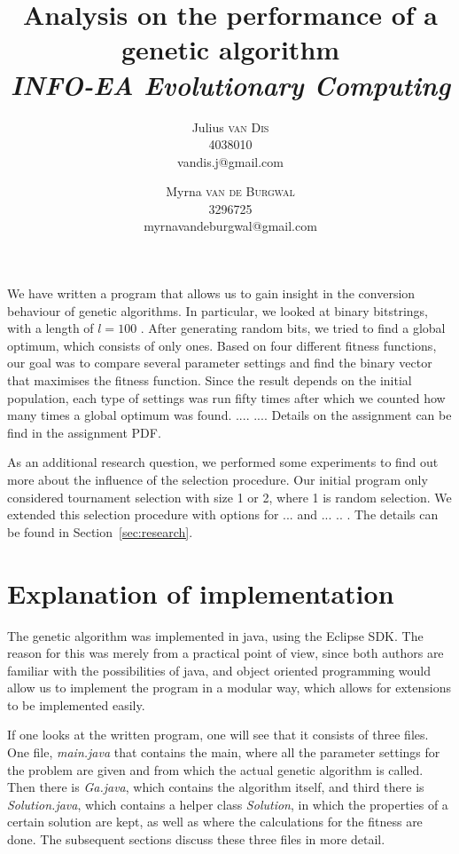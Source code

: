 \documentclass[10pt,a4paper,onecolumn]{article}
\title{Analysis on the performance of a genetic algorithm\\ \textit{INFO-EA Evolutionary Computing}}
\author{Julius \textsc{van Dis} \\ 4038010 \\vandis.j@gmail.com
\and Myrna \textsc{van de Burgwal} \\ 3296725 \\myrnavandeburgwal@gmail.com}
\begin{document}
\maketitle
\thispagestyle{empty}
%
\section*{}
We have written a program that allows us to gain insight in the conversion behaviour of genetic algorithms. In particular, we looked at binary bitstrings, with a length of $l=100$ . After generating random bits, we tried to find a global optimum, which consists of only ones. Based on four different fitness functions, our goal was to compare several parameter settings and find the binary vector that maximises the fitness function. Since the result depends on the initial population, each type of settings was run fifty times after which we counted how many times a global optimum was found.
....
....
Details on the assignment can be find in the assignment PDF.

As an additional research question, we performed some experiments to find out more about the influence of the selection procedure. Our initial program only considered tournament selection with size 1 or 2, where 1 is random selection. We extended this selection procedure with options for ... and  ... .. . The details can be found in Section~\ref{sec:research}.

\section{Explanation of implementation}
The genetic algorithm was implemented in java, using the Eclipse SDK. The reason for this was merely from a practical point of view, since both authors are familiar with the possibilities of java, and object oriented programming would allow us to implement the program in a modular way, which allows for extensions to be implemented easily.

If one looks at the written program, one will see that it consists of three files. One file, \textit{main.java} that contains the main, where all the parameter settings for the problem are given and from which the actual genetic algorithm is called. Then there is \textit{Ga.java}, which contains the algorithm itself, and third there is \textit{Solution.java}, which contains a helper class \textit{Solution}, in which the properties of a certain solution are kept, as well as where the calculations for the fitness are done. The subsequent sections discuss these three files in more detail.
\end{document}
